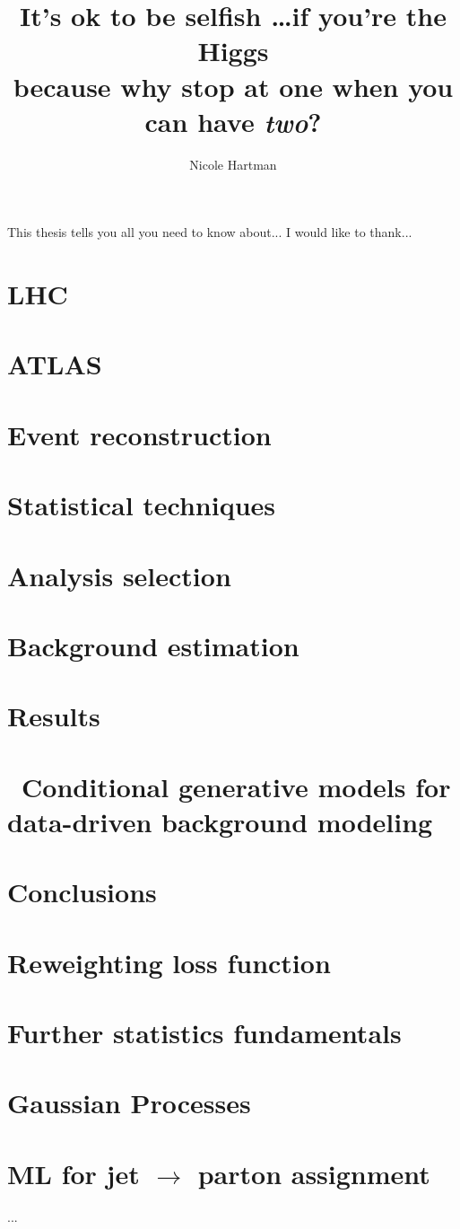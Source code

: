 \documentclass{report}
\begin{document}
\title{It's ok to be selfish \ldots if you're the Higgs\\
       because why stop at one when you can have \emph{two}?}
\author{Nicole Hartman}
 
\beforepreface
{}
This thesis tells you all you need to know about...
I would like to thank...
\afterpreface



\chapter{LHC}
\chapter{ATLAS}

\chapter{Event reconstruction}



\chapter{Statistical techniques}
\chapter{Analysis selection}
\chapter{Background estimation}
\chapter{Results}
\chapter{ Conditional generative models for data-driven background modeling}
\chapter{Conclusions}

\appendix
\chapter{Reweighting loss function}
\chapter{Further statistics fundamentals}
\chapter{Gaussian Processes}
\chapter{ML for jet $\rightarrow$ parton assignment}


...


\end{document}
